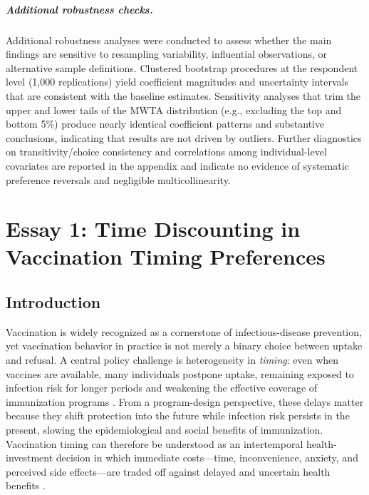 \documentclass[doublespacing]{utdthesis}
\let\cite=\citep
\begin{document}
\paragraph{Additional robustness checks.}
Additional robustness analyses were conducted to assess whether the main findings are sensitive to resampling variability, influential observations, or alternative sample definitions. Clustered bootstrap procedures at the respondent level (1{,}000 replications) yield coefficient magnitudes and uncertainty intervals that are consistent with the baseline estimates. Sensitivity analyses that trim the upper and lower tails of the MWTA distribution (e.g., excluding the top and bottom 5\%) produce nearly identical coefficient patterns and substantive conclusions, indicating that results are not driven by outliers. Further diagnostics on transitivity/choice consistency and correlations among individual-level covariates are reported in the appendix and indicate no evidence of systematic preference reversals and negligible multicollinearity.

\chapter{Essay 1: Time Discounting in Vaccination Timing Preferences}
\label{ch:essay1_discounting}

\section{Introduction}

Vaccination is widely recognized as a cornerstone of infectious-disease prevention, yet vaccination behavior in practice is not merely a binary choice between uptake and refusal. A central policy challenge is heterogeneity in \emph{timing}: even when vaccines are available, many individuals postpone uptake, remaining exposed to infection risk for longer periods and weakening the effective coverage of immunization programs \cite{MacDonald2015,Larson2014}. From a program-design perspective, these delays matter because they shift protection into the future while infection risk persists in the present, slowing the epidemiological and social benefits of immunization. Vaccination timing can therefore be understood as an intertemporal health-investment decision in which immediate costs—time, inconvenience, anxiety, and perceived side effects—are traded off against delayed and uncertain health benefits \cite{Grossman1972,Frederick2002,Laibson1997}.
\end{document}
